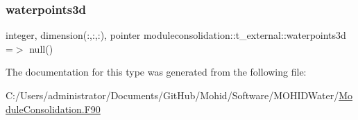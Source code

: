 \subsubsection{\texorpdfstring{waterpoints3d}{waterpoints3d}}
{\footnotesize\ttfamily integer, dimension(\+:,\+:,\+:), pointer moduleconsolidation\+::t\+\_\+external\+::waterpoints3d =$>$ null()\hspace{0.3cm}{\ttfamily [private]}}



The documentation for this type was generated from the following file\+:\begin{DoxyCompactItemize}
\item 
C\+:/\+Users/administrator/\+Documents/\+Git\+Hub/\+Mohid/\+Software/\+M\+O\+H\+I\+D\+Water/\mbox{\hyperlink{_module_consolidation_8_f90}{Module\+Consolidation.\+F90}}\end{DoxyCompactItemize}
